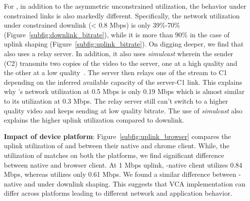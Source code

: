 For \meet, in addition to the asymmetric unconstrained utilization, the behavior under constrained links is also markedly different. Specifically, the network utilization under constrained downlink (< 0.8 Mbps) is only 39\%-70\% (Figure~\ref{subfig:downlink_bitrate}), while it is more than $90\%$ in the case of uplink shaping (Figure~\ref{subfig:uplink_bitrate}). On digging deeper, we find that \meet also uses a relay server. In addition, it also uses \textit{simulcast} wherein the sender (C2) transmits two copies of the video to the server, one at a high quality and the other at a low quality~\cite{nistico2020comparative}. The server then relays one of the stream to C1 depending on the inferred available capacity of the server-C1 link. This explains why \meet's network utilization at 0.5 Mbps is only 0.19 Mbps which is almost similar to its utilization at 0.3 Mbps. The relay server still can't switch to a higher quality video and keeps sending at low quality bitrate. The use of \textit{simulcast} also explains the higher uplink utilization compared to downlink. %



\textbf{Impact of device platform}: Figure~\ref{subfig:uplink_browser} compares the uplink utilization of \zoom and \teams between their native and chrome client. While, the utilization of \zoom matches on both the platforms, we find significant difference between \teams native and browser client. At 1 Mbps uplink, \teams-native client utilizes 0.84 Mbps, whereas \teamsbrowser utilizes only 0.61 Mbps. We found a similar difference between \teams-native and \teamsbrowser under downlink shaping. This suggests that VCA implementation can differ across platforms leading to different network and application behavior. 


